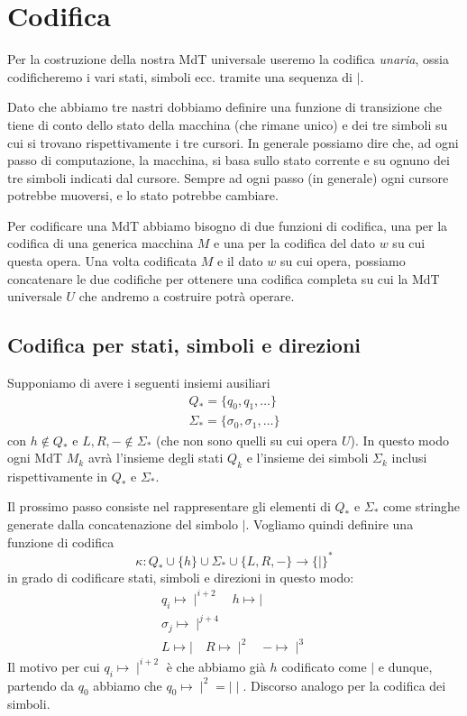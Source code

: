 \section{Codifica}
Per la costruzione della nostra MdT universale useremo la
codifica \emph{unaria}, ossia codificheremo i vari stati, simboli
ecc. tramite una sequenza di $\mid$.

Dato che abbiamo tre nastri dobbiamo definire una funzione di
transizione che tiene di conto dello stato della macchina (che
rimane unico) e dei tre simboli su cui si trovano rispettivamente
i tre cursori. In generale possiamo dire che, ad ogni passo di
computazione, la macchina, si basa sullo stato corrente e su
ognuno dei tre simboli indicati dal cursore. Sempre ad ogni passo
(in generale) ogni cursore potrebbe muoversi, e lo stato potrebbe
cambiare.

Per codificare una MdT abbiamo bisogno di due funzioni di
codifica, una per la codifica di una generica macchina $M$ e una
per la codifica del dato $w$ su cui questa opera. Una volta
codificata $M$ e il dato $w$ su cui opera, possiamo concatenare
le due codifiche per ottenere una codifica completa su cui la
MdT universale $U$ che andremo a costruire potrà operare.

\subsection{Codifica per stati, simboli e direzioni}
Supponiamo di avere i seguenti insiemi ausiliari
\begin{gather*}
	Q_* = \{ q_0, q_1, \dots \} \\
	\Sigma_* = \{ \sigma_0, \sigma_1, \dots \}
\end{gather*}
con $h \notin Q_*$ e $L, R, - \notin \Sigma_*$ (che non sono
quelli su cui opera $U$). In questo modo ogni MdT $M_k$ avrà
l'insieme degli stati $Q_k$ e l'insieme dei simboli $\Sigma_k$
inclusi rispettivamente in $Q_*$ e $\Sigma_*$.

Il prossimo passo consiste nel rappresentare gli elementi di
$Q_*$ e $\Sigma_*$ come stringhe generate dalla concatenazione
del simbolo $\mid$. Vogliamo quindi definire una funzione di
codifica
\[
	\kappa : Q_* \cup \{ h \} \cup \Sigma_* \cup \{ L, R, - \}
	\rightarrow \{ \mid \}^*
\]
in grado di codificare stati, simboli e direzioni in questo modo:
\begin{gather*}
	q_i \mapsto \mid^{i+2}      \quad h \mapsto \mid \\
	\sigma_j \mapsto \mid^{j+4} \\
	L \mapsto \mid \quad R \mapsto \mid^2 \quad - \mapsto \mid^3
\end{gather*}
Il motivo per cui $q_i \mapsto \mid^{i+2}$ è che abbiamo già $h$
codificato come $\mid$ e dunque, partendo da $q_0$ abbiamo che
$q_0 \mapsto \mid^2 = \mid \mid$. Discorso analogo per la
codifica dei simboli.

